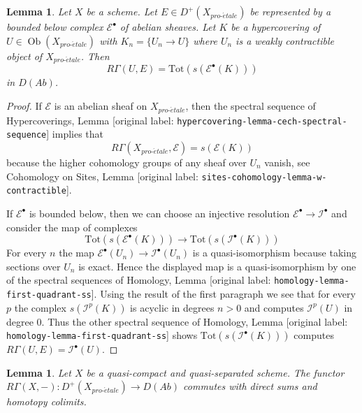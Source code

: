 \documentclass[10pt,a4paper]{article}
\theoremstyle{plain}
\newtheorem{lemma}[subsection]{Lemma}
\theoremstyle{definition}
\theoremstyle{remark}
\numberwithin{equation}{subsection}
\def\Ob{\mathop{\mathrm{Ob}}\nolimits}
\def\proetale{{pro\text{-}\acute{e}tale}}
\begin{document}
\begin{lemma}
\label{lemma-compute-cohomology}
Let $X$ be a scheme. Let $E \in D^+(X_\proetale)$ be represented by
a bounded below complex $\mathcal{E}^\bullet$ of abelian sheaves.
Let $K$ be a hypercovering of $U \in \Ob(X_\proetale)$ with
$K_n = \{U_n \to U\}$ where $U_n$ is a weakly contractible object of
$X_\proetale$. Then
$$
R\Gamma(U, E) = \text{Tot}(s(\mathcal{E}^\bullet(K)))
$$
in $D(\textit{Ab})$.
\end{lemma}

\begin{proof}
If $\mathcal{E}$ is an abelian
sheaf on $X_\proetale$, then the spectral sequence of
Hypercoverings, Lemma \textnormal{[original label: \nolinkurl{hypercovering-lemma-cech-spectral-sequence}]}
implies that
$$
R\Gamma(X_\proetale, \mathcal{E}) = s(\mathcal{E}(K))
$$
because the higher cohomology groups of any sheaf over $U_n$ vanish, see
Cohomology on Sites, Lemma \textnormal{[original label: \nolinkurl{sites-cohomology-lemma-w-contractible}]}.

\medskip\noindent
If $\mathcal{E}^\bullet$ is bounded below, then we can choose an injective
resolution $\mathcal{E}^\bullet \to \mathcal{I}^\bullet$ and consider
the map of complexes
$$
\text{Tot}(s(\mathcal{E}^\bullet(K)))
\longrightarrow
\text{Tot}(s(\mathcal{I}^\bullet(K)))
$$
For every $n$ the map $\mathcal{E}^\bullet(U_n) \to \mathcal{I}^\bullet(U_n)$
is a quasi-isomorphism because taking sections over $U_n$ is exact.
Hence the displayed map is a quasi-isomorphism by one of the spectral
sequences of
Homology, Lemma \textnormal{[original label: \nolinkurl{homology-lemma-first-quadrant-ss}]}.
Using the result of the first paragraph we see that for every $p$
the complex $s(\mathcal{I}^p(K))$ is acyclic in degrees $n > 0$ and
computes $\mathcal{I}^p(U)$ in degree $0$. Thus the other spectral
sequence of
Homology, Lemma \textnormal{[original label: \nolinkurl{homology-lemma-first-quadrant-ss}]}
shows $\text{Tot}(s(\mathcal{I}^\bullet(K)))$ computes
$R\Gamma(U, E) = \mathcal{I}^\bullet(U)$.
\end{proof}

\begin{lemma}
\label{lemma-quasi-compact-quasi-separated-commutes-direct-sums}
Let $X$ be a quasi-compact and quasi-separated scheme.
The functor $R\Gamma(X, -) : D^+(X_\proetale) \to D(\textit{Ab})$
commutes with direct sums and homotopy colimits.
\end{lemma}
\end{document}
